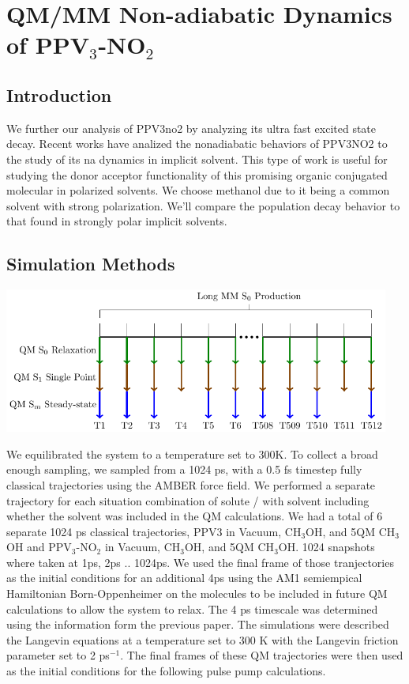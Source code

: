 \chapter{QM/MM Non-adiabatic Dynamics of PPV\(_3\)-NO\(_2\)}

\section{Introduction}
We further our analysis of PPV3no2 by analyzing its ultra fast excited state decay.
Recent works have analized the nonadiabatic behaviors of PPV3NO2  to the study of its na dynamics in implicit solvent. \cite{sifain2018photoexcited,dykstra2009conformational}
This type of work is useful for studying the donor acceptor functionality of this promising organic conjugated molecular in polarized solvents.
We choose methanol due to it being a common solvent with strong polarization.
We'll compare the population decay behavior to that found in strongly polar implicit solvents.

\section{Simulation Methods}

\noindent
\begin{minipage}[c]{\textwidth}
  \centering
  \includegraphics[width=5in]{../Paper2/scripted_diagrams/simulations-1.png}
  \label{fig:nonadiabaticSimulation}
\end{minipage}\bigskip

We equilibrated the system to a temperature set to 300K. To collect a broad
enough sampling, we sampled from a 1024 ps, with a 0.5 fs timestep fully
classical trajectories using the AMBER force field. We performed a separate
trajectory for each situation combination of solute / with solvent including
whether the solvent was included in the QM calculations. We had a total of 6
separate 1024 ps classical trajectories, PPV3 in Vacuum, CH\(_3\)OH, and 5QM CH\(_3\)OH
and PPV\(_3\)-NO\(_2\) in Vacuum, CH\(_3\)OH, and 5QM CH\(_3\)OH. 1024 snapshots where taken at
1ps, 2ps .. 1024ps. We used the final frame of those tranjectories as the
initial conditions for an additional 4ps using the AM1 semiempical Hamiltonian
Born-Oppenheimer on the molecules to be included in future QM calculations to
allow the system to relax. The 4 ps timescale was determined using the
information form the previous paper. The simulations were described the Langevin
equations at a temperature set to 300 K with the Langevin friction parameter set
to 2 ps\(^{-1}\). The final frames of these QM trajectories were then used as the
initial conditions for the following pulse pump calculations.

